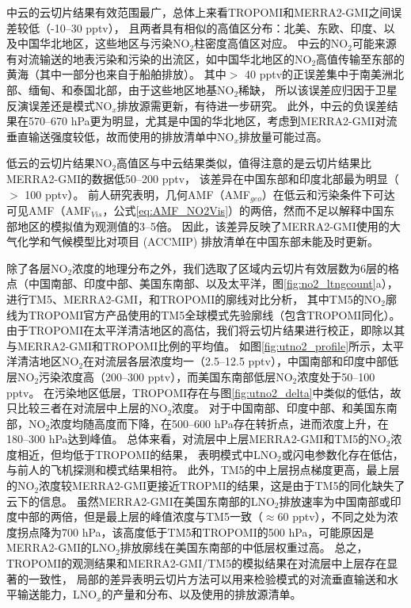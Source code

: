 中云的云切片结果有效范围最广，总体上来看TROPOMI和MERRA2-GMI之间误差较低（-10--30 pptv），
且两者具有相似的高值区分布：北美、东欧、印度、以及中国华北地区，这些地区与污染NO$_2$柱密度高值区对应。
中云的NO$_2$可能来源有对流输送的地表污染和污染的出流区，如中国华北地区的NO$_2$高值传输至东部的黄海（其中一部分也来自于船舶排放）。
其中$>$ 40 pptv的正误差集中于南美洲北部、缅甸、和泰国北部，由于这些地区地基NO$_2$稀缺，
所以该误差应归因于卫星反演误差还是模式NO$_x$排放源需更新，有待进一步研究。
此外，中云的负误差结果在570--670 hPa更为明显，尤其是中国的华北地区，考虑到MERRA2-GMI对流垂直输送强度较低，故而使用的排放清单中NO$_x$排放量可能过高\citep{Ziemke.2019}。

低云的云切片结果NO$_2$高值区与中云结果类似，值得注意的是云切片结果比MERRA2-GMI的数据低50--200 pptv，
该差异在中国东部和印度北部最为明显（$>$ 100 pptv）。
前人研究表明，几何AMF（AMF$_{geo}$）在低云和污染条件下可达可见AMF（AMF$_{Vis}$，公式\ref{eq:AMF_NO2Vis}）的两倍\citep{BelmonteRivas.2015}，然而不足以解释中国东部地区的模拟值为观测值的3--5倍。
因此，该差异反映了MERRA2-GMI使用的大气化学和气候模型比对项目 (ACCMIP) 排放清单在中国东部未能及时更新。

除了各层NO$_2$浓度的地理分布之外，我们选取了区域内云切片有效层数为6层的格点（中国南部、印度中部、美国东南部、以及太平洋，图\ref{fig:no2_ltngcount}a），
进行TM5、MERRA2-GMI，和TROPOMI的廓线对比分析，
其中TM5的NO$_2$廓线为TROPOMI官方产品使用的TM5全球模式先验廓线（包含TROPOMI同化）。
由于TROPOMI在太平洋清洁地区的高估，我们将云切片结果进行校正，即除以其与MERRA2-GMI和TROPOMI比例的平均值。
如图\ref{fig:utno2_profile}所示，太平洋清洁地区NO$_2$在对流层各层浓度均一（2.5--12.5 pptv），中国南部和印度中部低层NO$_2$污染浓度高（200--300 pptv），而美国东南部低层NO$_2$浓度处于50--100 pptv。
在污染地区低层，TROPOMI存在与图\ref{fig:utno2_delta}中类似的低估，故只比较三者在对流层中上层的NO$_2$浓度。
对于中国南部、印度中部、和美国东南部，NO$_2$浓度均随高度而下降，在500--600 hPa存在转折点，进而浓度上升，在180--300 hPa达到峰值。
总体来看，对流层中上层MERRA2-GMI和TM5的NO$_2$浓度相近，但均低于TROPOMI的结果，
表明模式中LNO$_2$或闪电参数化存在低估，与前人的飞机探测和模式结果相符\citep{Laughner.2019a,Zhang.2022a}。
此外，TM5的中上层拐点梯度更高，最上层的NO$_2$浓度较MERRA2-GMI更接近TROPMI的结果，这是由于TM5的同化缺失了云下的信息。
虽然MERRA2-GMI在美国东南部的LNO$_2$排放速率为中国南部或印度中部的两倍，但是最上层的峰值浓度与TM5一致（$\approx$60 pptv），不同之处为浓度拐点降为700 hPa，该高度低于TM5和TROPOMI的500 hPa，可能原因是MERRA2-GMI的LNO$_2$排放廓线在美国东南部的中低层权重过高。
总之，TROPOMI的观测结果和MERRA2-GMI/TM5的模拟结果在对流层中上层存在显著的一致性，
局部的差异表明云切片方法可以用来检验模式的对流垂直输送和水平输送能力，LNO$_x$的产量和分布、以及使用的排放源清单。


